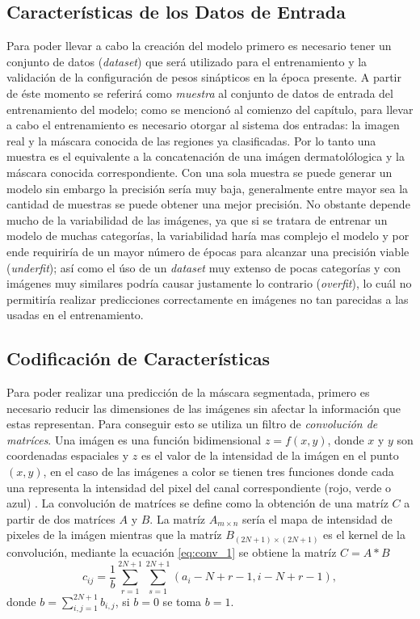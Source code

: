 \subsection{Características de los Datos de Entrada}
Para poder llevar a cabo la creación del modelo primero es necesario tener un conjunto de datos (\emph{dataset}) que será utilizado para el entrenamiento y la validación de la configuración de pesos sinápticos en la época presente.
A partir de éste momento se referirá como \emph{muestra} al conjunto de datos de entrada del entrenamiento del modelo; como se mencionó al comienzo del capítulo, para llevar a cabo el entrenamiento es necesario otorgar al sistema dos entradas: la imagen real y la máscara conocida de las regiones ya clasificadas. Por lo tanto una muestra es el equivalente a la concatenación de una imágen dermatolólogica y la máscara conocida correspondiente. Con una sola muestra se puede generar un modelo sin embargo la precisión sería muy baja, generalmente entre mayor sea la cantidad de muestras se puede obtener una mejor precisión. No obstante depende mucho de la variabilidad de las imágenes, ya que si se tratara de entrenar un modelo de muchas categorías, la variabilidad haría mas complejo el modelo y por ende requiriría de un mayor número de épocas para alcanzar una precisión viable (\emph{underfit}); así como el úso de un \emph{dataset} muy extenso de pocas categorías y con imágenes muy similares podría causar justamente lo contrario (\emph{overfit}), lo cuál no permitiría realizar predicciones correctamente en imágenes no tan parecidas a las usadas en el entrenamiento.

\subsection{Codificación de Características}
Para poder realizar una predicción de la máscara segmentada, primero es necesario reducir las dimensiones de las imágenes sin afectar la información que estas representan. Para conseguir esto se utiliza un filtro de \emph{convolución de matríces}. Una imágen es una función bidimensional $ z = f(x,y)$, donde $x$ y $y$ son coordenadas espaciales y $z$ es el valor de la intensidad de la imágen en el punto $(x , y)$, en el caso de las imágenes a color se tienen tres funciones donde cada una representa la intensidad del pixel del canal correspondiente (rojo, verde o azul) \citep[~p. 100]{conv_1}. La convolución de matríces se define como la obtención de una matríz $C$ a partir de dos matríces $A$ y $B$. La matríz $A_{m \times n}$ sería el mapa de intensidad de pixeles de la imágen mientras que la matríz $B_{(2N+1) \times (2N+1)}$ es el kernel de la convolución, mediante la ecuación \ref{eq:conv_1} se obtiene la matríz $C = A * B$
\begin{equation}
c_{ij} = \frac{1}{b} \sum_{r=1}^{2N+1}\sum_{s=1}^{2N+1}(a_i-N+r-1, i-N+r-1),
\label{eq:conv_1}
\end{equation}
donde $b = \sum_{i,j=1}^{2N+1} b_{i,j}$, si $b=0$ se toma $b=1$.

